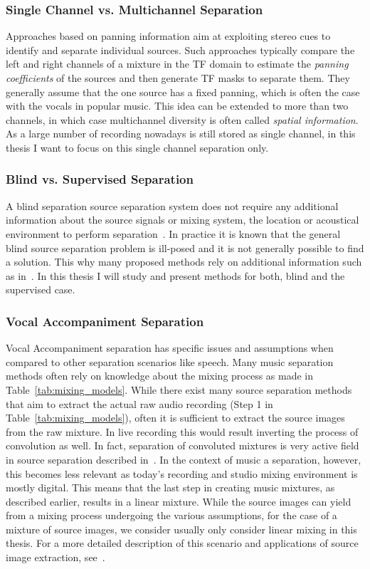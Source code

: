 \subsubsection{Single Channel vs. Multichannel Separation}
Approaches based on panning information aim at exploiting stereo cues to identify and separate individual sources. Such approaches typically compare the left and right channels of a mixture in the TF domain to estimate the \textit{panning coefficients} of the sources and then generate TF masks to separate them. They generally assume that the one source has a fixed panning, which is often the case with the vocals in popular music. This idea can be extended to more than two channels, in which case multichannel diversity is often called \textit{spatial information}.
As a large number of recording nowadays is still stored as single channel, in this thesis I want to focus on this single channel separation only.

\subsubsection{Blind vs. Supervised Separation}
A blind separation source separation system does not require any additional information about the source signals or mixing system, the location or acoustical environment to perform separation~\cite{makino07}.
In practice it is known that the general blind source separation problem is ill-posed and it is not generally possible to find a solution.
This why many proposed methods rely on additional information such as in~\cite{liutkus13, ewert14}.
In this thesis I will study and present methods for both, blind and the supervised case.

\subsubsection{Vocal Accompaniment Separation}
Vocal Accompaniment separation has specific issues and assumptions when compared to other separation scenarios like speech.
Many music separation methods often rely on knowledge about the mixing process as made in Table~\ref{tab:mixing_models}.
While there exist many source separation methods that aim to extract the actual raw audio recording (Step 1 in  Table~\ref{tab:mixing_models}), often it is sufficient to extract the source images from the raw mixture.
In live recording this would result inverting the process of convolution as well.
In fact, separation of convoluted mixtures is very active field in source separation described in~\cite{pedersen07}.
In the context of music a separation, however, this becomes less relevant as today's recording and studio mixing environment is mostly digital.
This means that the last step in creating music mixtures, as described earlier, results in a linear mixture.
While the source images can yield from a mixing process undergoing the various assumptions, for the case of a mixture of source images, we consider usually only consider linear mixing in this thesis.
For a more detailed description of this scenario and applications of source image extraction, see~\cite{sturmel12}.\\

